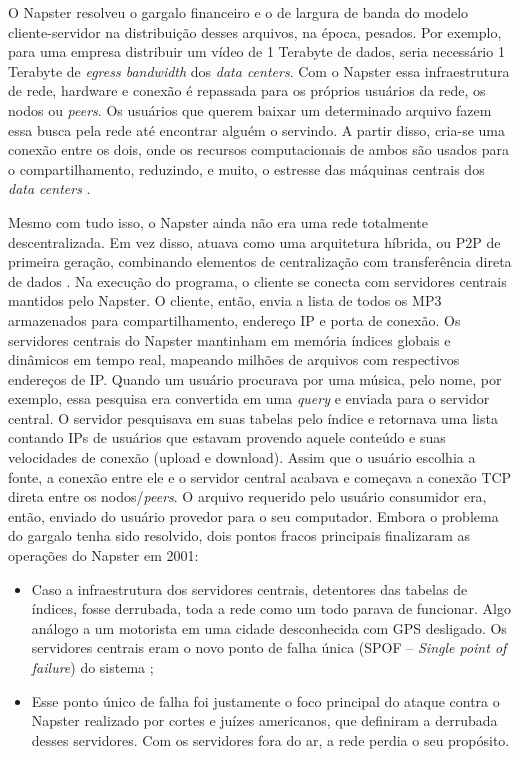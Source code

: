 O Napster resolveu o gargalo financeiro e o de largura de banda do modelo
cliente-servidor na distribuição desses arquivos, na época, pesados. Por
exemplo, para uma empresa distribuir um vídeo de 1 Terabyte de dados, seria
necessário 1 Terabyte de \textit{egress bandwidth} dos \textit{data centers}. Com o Napster
essa infraestrutura de rede, hardware e conexão é repassada para os
próprios usuários da rede, os nodos ou \textit{peers}. Os usuários que querem baixar
um determinado arquivo fazem essa busca pela rede até encontrar alguém o
servindo. A partir disso, cria-se uma conexão entre os dois, onde os
recursos computacionais de ambos são usados para o compartilhamento,
reduzindo, e muito, o estresse das máquinas centrais dos \textit{data centers}
\cite{adarhuberman2000}.

Mesmo com tudo isso, o Napster ainda não era uma rede totalmente
descentralizada. Em vez disso, atuava como uma arquitetura híbrida, ou
P2P de primeira geração, combinando elementos de centralização com
transferência direta de dados \cite{schollmeier2001}. Na execução do
programa, o cliente se conecta com servidores centrais mantidos pelo
Napster. O cliente, então, envia a lista de todos os MP3 armazenados para
compartilhamento, endereço IP e porta de conexão. Os servidores centrais do
Napster mantinham em memória índices globais e dinâmicos em tempo real,
mapeando milhões de arquivos com respectivos endereços de IP. Quando um
usuário procurava por uma música, pelo nome, por exemplo, essa pesquisa era
convertida em uma \textit{query} e enviada para o servidor central. O servidor
pesquisava em suas tabelas pelo índice e retornava uma lista contando IPs
de usuários que estavam provendo aquele conteúdo e suas velocidades de
conexão (upload e download). Assim que o usuário escolhia a fonte, a
conexão entre ele e o servidor central acabava e começava a conexão TCP
direta entre os nodos/\textit{peers}. O arquivo requerido pelo usuário consumidor
era, então, enviado do usuário provedor para o seu computador. Embora o
problema do gargalo tenha sido resolvido, dois pontos fracos principais
finalizaram as operações do Napster em 2001:

\begin{itemize}
    \item Caso a infraestrutura dos servidores centrais, detentores das
    tabelas de índices, fosse derrubada, toda a rede como um todo parava de
    funcionar. Algo análogo a um motorista em uma cidade desconhecida com
    GPS desligado. Os servidores centrais eram o novo ponto de falha única
    (SPOF -- \textit{Single point of failure}) do sistema \cite{tanenbaumvansteen2007};

    \item Esse ponto único de falha foi justamente o foco principal do
    ataque contra o Napster realizado por cortes e juízes americanos, que
    definiram a derrubada desses servidores. Com os servidores fora do ar,
    a rede perdia o seu propósito.
\end{itemize}

